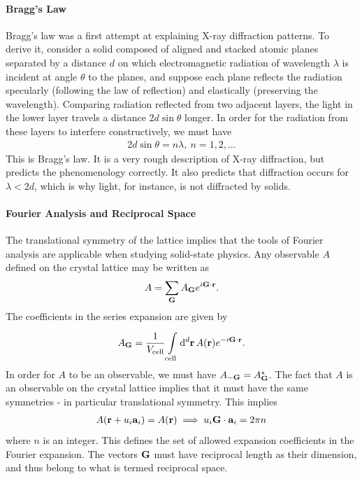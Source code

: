 \paragraph{Bragg's Law}
Bragg's law was a first attempt at explaining X-ray diffraction patterns. To derive it, consider a solid composed of aligned and stacked atomic planes separated by a distance $d$ on which electromagnetic radiation of wavelength $\lambda$ is incident at angle $\theta$ to the planes, and suppose each plane reflects the radiation specularly (following the law of reflection) and elastically (preserving the wavelength). Comparing radiation reflected from two adjacent layers, the light in the lower layer travels a distance $2d\sin{\theta}$ longer. In order for the radiation from these layers to interfere constructively, we must have
\begin{align*}
	2d\sin{\theta} = n\lambda,\ n = 1, 2, \dots
\end{align*}
This is Bragg's law. It is a very rough description of X-ray diffraction, but predicts the phenomenology correctly. It also predicts that diffraction occurs for $\lambda < 2d$, which is why light, for instance, is not diffracted by solids.

\paragraph{Fourier Analysis and Reciprocal Space}
The translational symmetry of the lattice implies that the tools of Fourier analysis are applicable when studying solid-state physics. Any observable $A$ defined on the crystal lattice may be written as
\begin{align*}
	A = \sum\limits_{\vb{G}}A_{\vb{G}}e^{i\vb{G}\cdot\vb{r}}.
\end{align*}
The coefficients in the series expansion are given by
\begin{align*}
	A_{\vb{G}} = \frac{1}{V_{\text{cell}}}\integ[d]{\text{cell}}{}{\vb{r}}{A(\vb{r})e^{-i\vb{G}\cdot\vb{r}}}.
\end{align*}
In order for $A$ to be an observable, we must have $A_{-\vb{G}} = \cc{A_{\vb{G}}}$. The fact that $A$ is an observable on the crystal lattice implies that it must have the same symmetries - in particular translational symmetry. This implies
\begin{align*}
	A(\vb{r} + u_{i}\vb{a}_{i}) = A(\vb{r}) \implies u_{i}\vb{G}\cdot\vb{a}_{i} = 2\pi n
\end{align*}
where $n$ is an integer. This defines the set of allowed expansion coefficients in the Fourier expansion. The vectors $\vb{G}$ must have reciprocal length as their dimension, and thus belong to what is termed reciprocal space.


